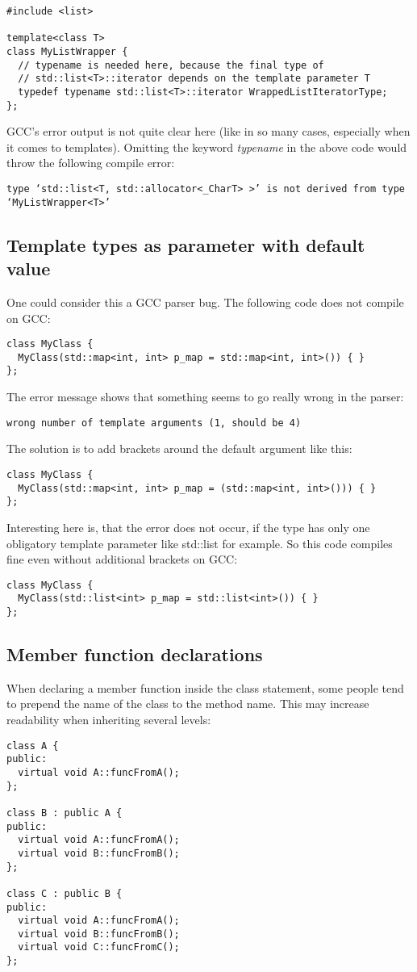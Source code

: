 \begin{verbatim}
#include <list>

template<class T>
class MyListWrapper {
  // typename is needed here, because the final type of 
  // std::list<T>::iterator depends on the template parameter T
  typedef typename std::list<T>::iterator WrappedListIteratorType;
};
\end{verbatim}
GCC's error output is not quite clear here (like in so many cases, especially when it comes to templates). Omitting the keyword \emph{typename} in the above code would throw the following compile error:
\begin{verbatim}
type ‘std::list<T, std::allocator<_CharT> >’ is not derived from type ‘MyListWrapper<T>’
\end{verbatim}

\subsection{Template types as parameter with default value} One could consider this a GCC parser bug. The following code does not compile on GCC:
\begin{verbatim}
class MyClass {
  MyClass(std::map<int, int> p_map = std::map<int, int>()) { }
};
\end{verbatim}
The error message shows that something seems to go really wrong in the parser:
\begin{verbatim}
wrong number of template arguments (1, should be 4)
\end{verbatim}
The solution is to add brackets around the default argument like this:
\begin{verbatim}
class MyClass {
  MyClass(std::map<int, int> p_map = (std::map<int, int>())) { }
};
\end{verbatim}
Interesting here is, that the error does not occur, if the type has only one obligatory template parameter like std::list for example. So this code compiles fine even without additional brackets on GCC:
\begin{verbatim}
class MyClass {
  MyClass(std::list<int> p_map = std::list<int>()) { }
};
\end{verbatim}

\subsection{Member function declarations} When declaring a member function inside the class statement, some people tend to prepend the name of the class to the method name. This may increase readability when inheriting several levels:
\begin{verbatim}
class A {
public:
  virtual void A::funcFromA();
};

class B : public A {
public:
  virtual void A::funcFromA();
  virtual void B::funcFromB();
};

class C : public B {
public:
  virtual void A::funcFromA();
  virtual void B::funcFromB();
  virtual void C::funcFromC();
};
\end{verbatim}

